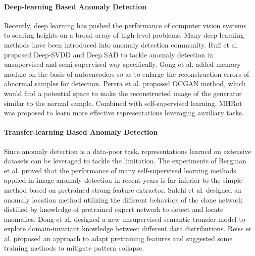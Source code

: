 \documentclass{article}
\begin{document}
\paragraph{Deep-learning Based Anomaly Detection} 
Recently, deep learning has pushed the performance of computer vision systems to soaring heights on a broad array of high-level problems. Many deep learning methods have been introduced into anomaly detection community. Ruff et al. proposed Deep-SVDD \cite{ruff2018deep} and  Deep SAD \cite{ruff2019deep} to tackle anomaly detection in unsupervised and semi-supervised way specifically. Gong et al. \cite{gong2019memorizing} added memory module on the basis of autoencoders so as to enlarge the reconstruction errors of abnormal samples for detection. Perera et al. \cite{10} proposed OCGAN method, which would find a potential space to make the reconstructed image of the generator similar to the normal sample. Combined with self-supervised learning, MHRot \cite{hendrycks2019using} was proposed to learn more effective representations leveraging auxiliary tasks. 


\paragraph{Transfer-learning Based Anomaly Detection} 
Since anomaly detection is a data-poor task, representations learned on extensive datasets can be leveraged to tackle the limitation. The experiments of Bergman et al. \cite{14} proved that the performance of many self-supervised learning methods applied in image anomaly detection in recent years is far inferior to the simple method based on pretrained strong feature extractor. Salehi et al. \cite{salehi2021multiresolution} designed an anomaly location method utilizing the different behaviors of the clone network distilled by knowledge of pretrained expert network to detect and locate anomalies. Dong et al. \cite{dong2021and} designed a new unsupervised semantic transfer model to explore domain-invariant knowledge between different data distributions. Reiss et al. \cite{reiss2021panda} proposed an approach to adapt pretraining features and suggested some training methods to mitigate pattern collapse.
\end{document}
